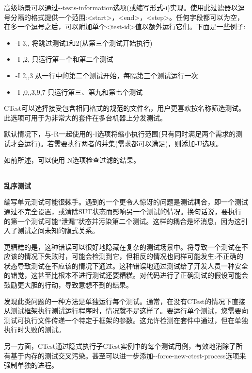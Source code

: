 高级场景可以通过-{}-tests-information选项(或缩写形式-i)实现。使用此过滤器以逗号分隔的格式提供一个范围:<start>，<end>，<step>。任何字段都可以为空，在多一个逗号之后，可以附加单个<test-id>值以额外运行它们。下面是一些例子:

\begin{itemize}
\item 
-I 3,, 将跳过测试1和2(从第三个测试开始执行)

\item 
-I ,2, 只运行第一个和第二个测试

\item 
-I 2,,3 从一行中的第二个测试开始，每隔第三个测试运行一次

\item 
-I ,0,,3,9,7 只运行第三、第九和第七个测试
\end{itemize}

CTest可以选择接受包含相同格式的规范的文件名，用户更喜欢按名称筛选测试。此选项可用于为非常大的套件在多台机器上分发测试。

默认情况下，与-R一起使用的-I选项将缩小执行范围(只有同时满足两个需求的测试才会运行)。若需要执行两者的并集(需求都可以满足)，则添加-U选项。

如前所述，可以使用-N选项检查过滤的结果。

\hspace*{\fill} \\ %
\noindent
\textbf{乱序测试}

编写单元测试可能很棘手。遇到的一个更令人惊讶的问题是测试耦合，即一个测试通过不完全设置，或清除SUT状态而影响另一个测试的情况。换句话说，要执行的第一个测试可能“泄漏”状态并污染第二个测试。这样的耦合是坏消息，因为这引入了测试之间未知的隐式关系。

更糟糕的是，这种错误可以很好地隐藏在复杂的测试场景中。将导致一个测试在不应该的情况下失败时，可能会检测到它，但相反的情况也同样可能发生:不正确的状态导致测试在不应该的情况下通过。这种错误地通过测试给了开发人员一种安全的错觉，这甚至比根本不进行测试还要糟糕。对代码进行了正确测试的假设可能会鼓励更大胆的行动，导致意想不到的结果。

发现此类问题的一种方法是单独运行每个测试。通常，在没有CTest的情况下直接从测试框架执行测试运行程序时，情况就不是这样了。要运行单个测试，您需要向测试可执行文件传递一个特定于框架的参数。这允许检测在套件中通过，但在单独执行时失败的测试。

另一方面，CTest通过隐式执行子CTest实例中的每个测试用例，有效地消除了所有基于内存的测试交叉污染。甚至可以进一步添加-{}-force-new-ctest-process选项来强制单独的进程。

